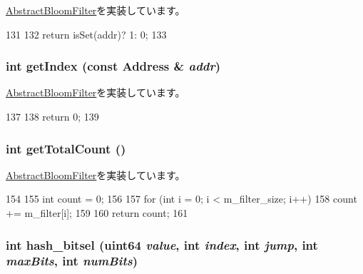 \hyperlink{classAbstractBloomFilter_ab6253919ea6ff1b2c17506742b34147d}{AbstractBloomFilter}を実装しています。


\begin{DoxyCode}
131 {
132     return isSet(addr)? 1: 0;
133 }
\end{DoxyCode}
\hypertarget{classMultiBitSelBloomFilter_a19f42f6f2fc3501021b768f0df8108b2}{
\subsubsection[{getIndex}]{\setlength{\rightskip}{0pt plus 5cm}int getIndex (const {\bf Address} \& {\em addr})}}
\label{classMultiBitSelBloomFilter_a19f42f6f2fc3501021b768f0df8108b2}


\hyperlink{classAbstractBloomFilter_a4dd174ae24a8237d41cf0b02c78b896d}{AbstractBloomFilter}を実装しています。


\begin{DoxyCode}
137 {
138     return 0;
139 }
\end{DoxyCode}
\hypertarget{classMultiBitSelBloomFilter_a97f66183ea41a7c123bab9dd5313a74a}{
\subsubsection[{getTotalCount}]{\setlength{\rightskip}{0pt plus 5cm}int getTotalCount ()}}
\label{classMultiBitSelBloomFilter_a97f66183ea41a7c123bab9dd5313a74a}


\hyperlink{classAbstractBloomFilter_a25ea5e1ef3d4911226f37649b6efed22}{AbstractBloomFilter}を実装しています。


\begin{DoxyCode}
154 {
155     int count = 0;
156 
157     for (int i = 0; i < m_filter_size; i++) {
158         count += m_filter[i];
159     }
160     return count;
161 }
\end{DoxyCode}
\hypertarget{classMultiBitSelBloomFilter_a165665b101146ec0bf551d29a11b99a2}{
\subsubsection[{hash\_\-bitsel}]{\setlength{\rightskip}{0pt plus 5cm}int hash\_\-bitsel ({\bf uint64} {\em value}, \/  int {\em index}, \/  int {\em jump}, \/  int {\em maxBits}, \/  int {\em numBits})}}
\label{classMultiBitSelBloomFilter_a165665b101146ec0bf551d29a11b99a2}



